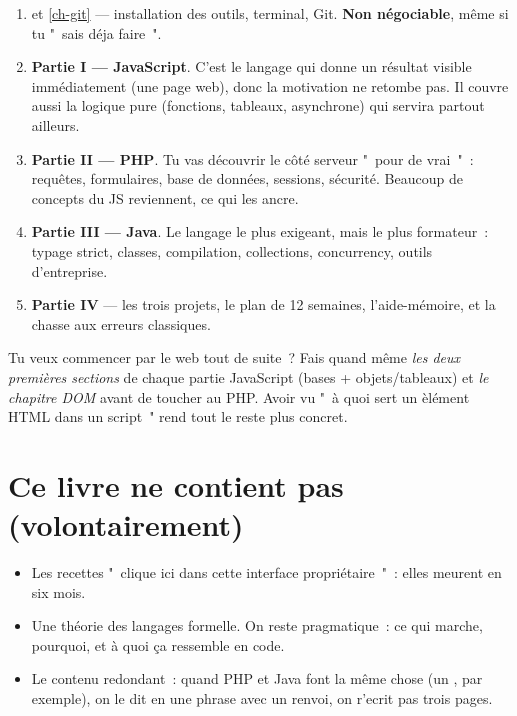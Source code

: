 \begin{enumerate}
  \item {} et \cref{ch-git} --- installation des outils, terminal, Git.
        \textbf{Non n\'egociable}, m\^eme si tu "~sais d\'eja faire~".
  \item \textbf{Partie I --- JavaScript}. C'est le langage qui donne un r\'esultat visible
        imm\'ediatement (une page web), donc la motivation ne retombe pas. Il couvre aussi la
        logique pure (fonctions, tableaux, asynchrone) qui servira partout ailleurs.
  \item \textbf{Partie II --- PHP}. Tu vas d\'ecouvrir le c\^ot\'e serveur "~pour de vrai~"~: requ\^etes,
        formulaires, base de donn\'ees, sessions, s\'ecurit\'e. Beaucoup de concepts du JS reviennent,
        ce qui les ancre.
  \item \textbf{Partie III --- Java}. Le langage le plus exigeant, mais le plus formateur~: typage
        strict, classes, compilation, collections, concurrency, outils d'entreprise.
  \item \textbf{Partie IV} --- les trois projets, le plan de 12 semaines, l'aide-m\'emoire,
        et la chasse aux erreurs classiques.
\end{enumerate}

\begin{astuce}
Tu veux commencer par le web tout de suite~? Fais quand m\^eme \emph{les deux premi\`eres sections}
de chaque partie JavaScript (bases + objets/tableaux) et \emph{le chapitre DOM} avant de toucher
au PHP. Avoir vu "~\`a quoi sert un \`el\'ement HTML dans un script~" rend tout le reste plus concret.
\end{astuce}

\section{Ce livre ne contient pas (volontairement)}

\begin{itemize}
  \item Les recettes "~clique ici dans cette interface propri\'etaire~"~: elles meurent en six mois.
  \item Une th\'eorie des langages formelle. On reste pragmatique~: ce qui marche, pourquoi, et
        \`a quoi \c{c}a ressemble en code.
  \item Le contenu redondant~: quand PHP et Java font la m\^eme chose (un , par exemple),
        on le dit en une phrase avec un renvoi, on r'ecrit pas trois pages.
\end{itemize}

